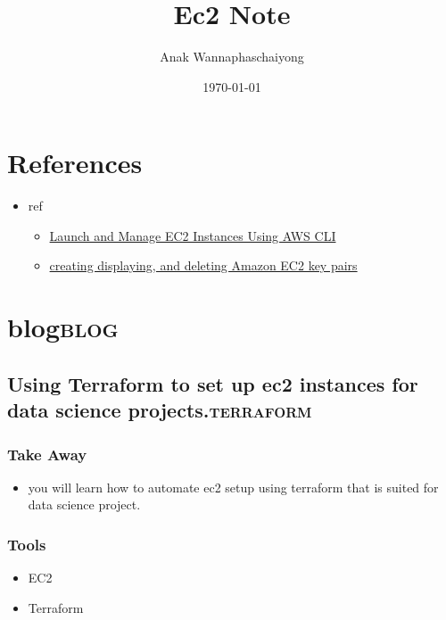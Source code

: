 \documentclass[11pt]{article}
\author{Anak Wannaphaschaiyong}
\date{\today}
\title{Ec2 Note}
\begin{document}
\maketitle
\tableofcontents


\section{References}
\label{sec:org6c103f0}
\begin{itemize}
\item ref
\begin{itemize}
\item \href{https://medium.com/swlh/launch-and-manage-ec2-instances-using-aws-cli-7efae00e264b}{Launch and Manage EC2 Instances Using AWS CLI}
\item \href{https://docs.aws.amazon.com/cli/latest/userguide/cli-services-ec2-keypairs.html\#cli-services-ec2-keypairs-prereqs}{creating displaying, and deleting Amazon EC2 key pairs}
\end{itemize}
\end{itemize}
\section{blog\hfill{}\textsc{blog}}
\label{sec:org423743a}
\subsection{Using Terraform to set up ec2 instances for data science projects.\hfill{}\textsc{terraform}}
\label{sec:org0b9500a}
\subsubsection{Take Away}
\label{take-away}
\begin{itemize}
\item you will learn how to automate ec2 setup using terraform that is
suited for data science project.
\end{itemize}

\subsubsection{Tools}
\label{tools}
\begin{itemize}
\item EC2
\item Terraform
\end{itemize}
\end{document}

